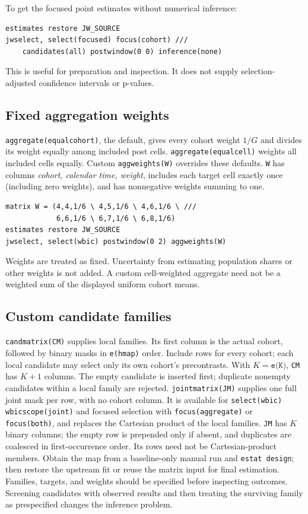 \documentclass[11pt]{article}
\newcommand{\cmd}[1]{\texttt{#1}}
\begin{document}
To get the focused point estimates without numerical inference:
\begin{lstlisting}
estimates restore JW_SOURCE
jwselect, select(focused) focus(cohort) ///
    candidates(all) postwindow(0 0) inference(none)
\end{lstlisting}
This is useful for preparation and inspection. It does not supply
selection-adjusted confidence intervals or p-values.

\subsection{Fixed aggregation weights}
\cmd{aggregate(equalcohort)}, the default, gives every cohort weight $1/G$
and divides its weight equally among included post cells.
\cmd{aggregate(equalcell)} weights all included cells equally. Custom
\cmd{aggweights(W)} overrides these defaults. \cmd{W} has columns
\emph{cohort, calendar time, weight}, includes each target cell exactly once
(including zero weights), and has nonnegative weights summing to one.
\begin{lstlisting}
matrix W = (4,4,1/6 \ 4,5,1/6 \ 4,6,1/6 \ ///
            6,6,1/6 \ 6,7,1/6 \ 6,8,1/6)
estimates restore JW_SOURCE
jwselect, select(wbic) postwindow(0 2) aggweights(W)
\end{lstlisting}
Weights are treated as fixed. Uncertainty from estimating population shares
or other weights is not added. A custom cell-weighted aggregate need not be
a weighted sum of the displayed uniform cohort means.

\subsection{Custom candidate families}
\cmd{candmatrix(CM)} supplies local families. Its first column is the actual
cohort, followed by binary masks in \cmd{e(hmap)} order. Include rows for every
cohort; each local candidate may select only its own cohort's precontrasts.
With $K=\cmd{e(K)}$, \cmd{CM} has $K+1$ columns. The empty candidate is
inserted first; duplicate nonempty candidates within a local family are
rejected. \cmd{jointmatrix(JM)} supplies
one full joint mask per row, with no cohort column. It is available for
\cmd{select(wbic) wbicscope(joint)} and focused selection with
\cmd{focus(aggregate)} or \cmd{focus(both)}, and replaces the
Cartesian product of the local families. \cmd{JM} has $K$ binary columns;
the empty row is prepended only if absent, and duplicates are coalesced in
first-occurrence order. Its rows need not be Cartesian-product members. Obtain the map from a baseline-only
manual run and \cmd{estat design}; then restore the upstream fit or reuse the
matrix input for final estimation. Families, targets, and weights should be
specified before inspecting outcomes. Screening candidates with observed
results and then treating the surviving family as prespecified changes the
inference problem.
\end{document}
